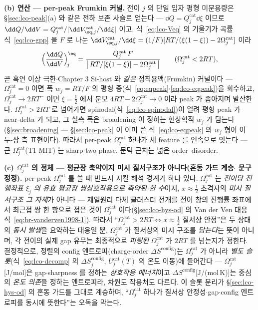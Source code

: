 \textbf{(b) 연산 --- per-peak Frumkin 커널.} 전이 $j$ 의 단일 입자 평형 미분용량은 \S\ref{sec:lco-peak}(a) 와
같은 전하 보존 사슬로 얻는다 --- $\dd Q=Q_j^\mathrm{cat}\dd\xi$ 이므로 $\dd Q/\dd V=Q_j^\mathrm{cat}/
|\dd V_{\eq,j}^\mathrm{cat}/\dd\xi|$ 이고, 식~\eqref{eq:lco-Veq} 의 기울기가 곡률 식~\eqref{eq:lco-gpp} 을 $F$
로 나눈 $\dd V_{\eq,j}^\mathrm{cat}/\dd\xi=(1/F)[RT/(\xi(1-\xi))-2\Omega_j^\mathrm{cat}]$ 이라
\begin{equation}
\Big(\frac{\dd Q}{\dd V}\Big)_{\!j}^{\eq}
=\frac{Q_j^\mathrm{cat}\,F}{\big|\,RT/[\xi(1-\xi)]-2\Omega_j^\mathrm{cat}\,\big|}
\qquad(\Omega_j^\mathrm{cat}<2RT),
\label{eq:lcoom-frumkin}
\end{equation}
곧 흑연 이상 극한$\cdot$Chapter 3 Si-host 와 \emph{같은} 정칙용액(Frumkin) 커널이다 --- $\Omega_j^\mathrm{cat}{=}0$
이면 폭 $w_j{=}RT/F$ 의 평형 종(식~\eqref{eq:eqpeak}$\cdot$\eqref{eq:lco-eqpeak})을 회수하고,
$\Omega_j^\mathrm{cat}\!\to\!2RT^{-}$ 이면 $\xi{=}\tfrac12$ 에서 분모 $4RT-2\Omega_j^\mathrm{cat}\!\to\!0$ 이라
peak 가 좁아지며 발산한다. $\Omega_j^\mathrm{cat}>2RT$ 로 넘어가면 spinodal(식~\eqref{eq:lco-spinodal})이 열려
평형 peak 가 near-delta 가 되고, 그 실측 폭은 broadening 이 정하는 현상학적 $w_j$ 가 담는다
(\S\ref{sec:broadening} --- \S\ref{sec:lco-peak} 이 이미 쓴 식~\eqref{eq:lco-eqpeak} 의 $w_j$ 형이 이 두-상 측
표현이다). 따라서 per-peak $\Omega_j^\mathrm{cat}$ 하나가 세 feature 를 연속으로 잇는다 --- 큰
$\Omega_j^\mathrm{cat}$(T1 MIT) 는 sharp two-phase, 문턱 근처는 넓은 order--disorder.

\textbf{(c) $\Omega_j^\mathrm{cat}$ 의 정체 --- 평균장 축약이지 미시 질서구조가 아니다(혼동 가드 계승$\cdot$%
문구 정정).} per-peak $\Omega_j^\mathrm{cat}$ 를 쓸 때 반드시 지킬 해석 경계가 하나 있다. $\Omega_j^\mathrm{cat}$ 는
\emph{전이당 진행좌표 $\xi_j$ 의 유효 평균장 쌍상호작용으로 축약된 한 수}이지, $x\!\approx\!\tfrac12$ 초격자의
\emph{미시 질서구조 그 자체}가 아니다 --- 제일원리 다체 클러스터 전개를 전이 창의 진행률 좌표에서 최근접 쌍
한 항으로 접은 것이 $\Omega_j^\mathrm{cat}$ 이다(\S\ref{sec:lco-hys-od} 의 Van der Ven 대응
식~\eqref{eq:br-vanderven1998-1}). 따라서 ``$\Omega_j^\mathrm{cat}>2RT\Leftrightarrow x\!\approx\!\tfrac12$
질서상 안정''은 두 상태의 \emph{동시 발생}을 요약하는 대응일 뿐, $\Omega_j^\mathrm{cat}$ 가 질서상의 미시
구조를 \emph{담는다}는 뜻이 아니며, 각 전이의 실제 gap 유무는 최종적으로 \emph{피팅된} $\Omega_j^\mathrm{cat}$
가 $2RT$ 를 넘는지가 정한다. 결정적으로, 정렬의 config 엔트로피(charge-order $\Delta S^\mathrm{config}$)는
$\Omega_j^\mathrm{cat}$ 가 아니라 \emph{별도 슬롯}(식~\eqref{eq:lco-decomp} 의 $\Delta S_j^\mathrm{config}$,
$U_j^\mathrm{cat}(T)$ 의 온도 이동)에 들어간다 --- $\Omega_j^\mathrm{cat}$[J/mol]은 gap$\cdot$sharpness 를
정하는 \emph{상호작용 에너지}이고 $\Delta S^\mathrm{config}$[J/(mol\,K)]는 중심의 \emph{온도 의존}을 정하는
엔트로피라, 차원도 작용처도 다르다. 이 슬롯 분리가 \S\ref{sec:lco-hys-od} 의 혼동 가드를 그대로 계승하며,
``$\Omega_j^\mathrm{cat}$ 하나가 질서상 안정성$\cdot$gap$\cdot$config 엔트로피를 동시에 뜻한다''는 오독을 막는다.

